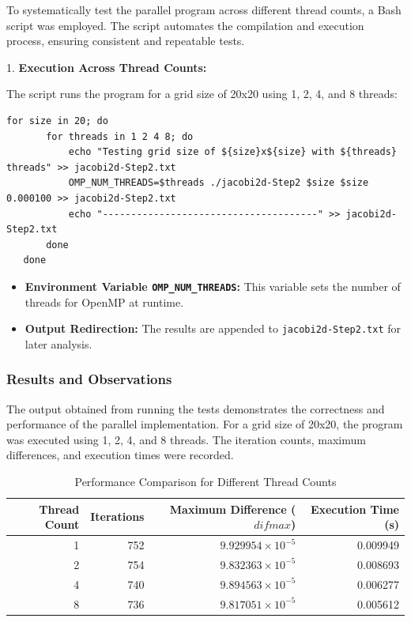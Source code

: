 \documentclass{article}
\begin{document}
To systematically test the parallel program across different thread counts, a Bash script was employed. The script automates the compilation and execution process, ensuring consistent and repeatable tests.

1. \textbf{Execution Across Thread Counts:}

   The script runs the program for a grid size of 20x20 using 1, 2, 4, and 8 threads:

   \begin{lstlisting}[style=BashStyle, caption={}]
   for size in 20; do
       for threads in 1 2 4 8; do
           echo "Testing grid size of ${size}x${size} with ${threads} threads" >> jacobi2d-Step2.txt
           OMP_NUM_THREADS=$threads ./jacobi2d-Step2 $size $size 0.000100 >> jacobi2d-Step2.txt
           echo "--------------------------------------" >> jacobi2d-Step2.txt
       done
   done
   \end{lstlisting}

    \begin{itemize}
        \item \textbf{Environment Variable \texttt{OMP\_NUM\_THREADS}:} This variable sets the number of threads for OpenMP at runtime.
        \item \textbf{Output Redirection:} The results are appended to \texttt{jacobi2d-Step2.txt} for later analysis.
    \end{itemize}


\subsubsection{Results and Observations}

The output obtained from running the tests demonstrates the correctness and performance of the parallel implementation. For a grid size of 20x20, the program was executed using 1, 2, 4, and 8 threads. The iteration counts, maximum differences, and execution times were recorded.

\begin{table}[H]
    \centering
    \caption{Performance Comparison for Different Thread Counts}
    \label{tab:performance_comparison}
    \begin{tabular}{rrrr}
    \toprule
    \textbf{Thread Count} & \textbf{Iterations} & \textbf{Maximum Difference ($difmax$)} & \textbf{Execution Time (s)} \\
    \midrule
    1 & 752 & $9.929954 \times 10^{-5}$ & 0.009949 \\
    2 & 754 & $9.832363 \times 10^{-5}$ & 0.008693 \\
    4 & 740 & $9.894563 \times 10^{-5}$ & 0.006277 \\
    8 & 736 & $9.817051 \times 10^{-5}$ & 0.005612 \\
    \bottomrule
    \end{tabular}
\end{table}
\end{document}
